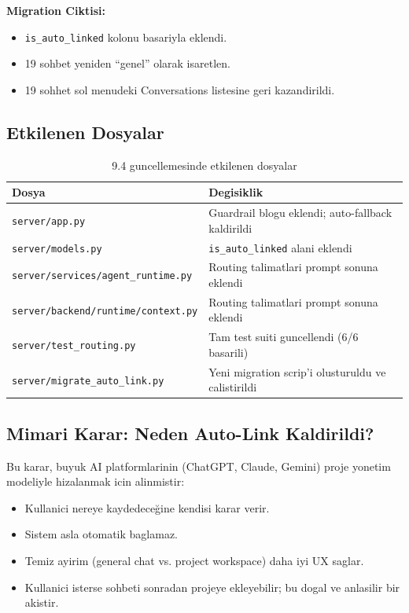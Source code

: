 \documentclass[11pt,a4paper]{article}
\begin{document}
{\textbf{Migration Ciktisi:}
\begin{itemize}[leftmargin=1.5em]
    \item \texttt{is\_auto\_linked} kolonu basariyla eklendi.
    \item 19 sohbet yeniden ``genel'' olarak isaretlen.
    \item 19 sohhet sol menudeki Conversations listesine geri kazandirildi.
\end{itemize}

\subsection{Etkilenen Dosyalar}

\begin{table}[h]
\centering
\begin{tabularx}{\textwidth}{@{}lX@{}}
\toprule
Dosya & Degisiklik \\
\midrule
\texttt{server/app.py} & Guardrail blogu eklendi; auto-fallback kaldirildi \\
\texttt{server/models.py} & \texttt{is\_auto\_linked} alani eklendi \\
\texttt{server/services/agent\_runtime.py} & Routing talimatlari prompt sonuna eklendi \\
\texttt{server/backend/runtime/context.py} & Routing talimatlari prompt sonuna eklendi \\
\texttt{server/test\_routing.py} & Tam test suiti guncellendi (6/6 basarili) \\
\texttt{server/migrate\_auto\_link.py} & Yeni migration scrip'i olusturuldu ve calistirildi \\
\bottomrule
\end{tabularx}
\caption{9.4 guncellemesinde etkilenen dosyalar}
\end{table}

\subsection{Mimari Karar: Neden Auto-Link Kaldirildi?}

Bu karar, buyuk AI platformlarinin (ChatGPT, Claude, Gemini) proje yonetim modeliyle hizalanmak icin alinmistir:
\begin{itemize}[leftmargin=1.5em]
    \item Kullanici nereye kaydedeceğine kendisi karar verir.
    \item Sistem asla otomatik baglamaz.
    \item Temiz ayirim (general chat vs. project workspace) daha iyi UX saglar.
    \item Kullanici isterse sohbeti sonradan projeye ekleyebilir; bu dogal ve anlasilir bir akistir.
\end{itemize}

}
\end{document}
